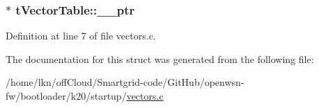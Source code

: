 \subsubsection[{\texorpdfstring{\+\_\+\+\_\+ptr}{__ptr}}]{$\ast$ t\+Vector\+Table\+::\+\_\+\+\_\+ptr}\hypertarget{structt_vector_table_a131a71eb2af6dfdd25a05f4a62f0b5fa}{}\label{structt_vector_table_a131a71eb2af6dfdd25a05f4a62f0b5fa}


Definition at line 7 of file vectors.\+c.



The documentation for this struct was generated from the following file\+:\begin{DoxyCompactItemize}
\item 
/home/lkn/off\+Cloud/\+Smartgrid-\/code/\+Git\+Hub/openwsn-\/fw/bootloader/k20/startup/\hyperlink{bootloader_2k20_2startup_2vectors_8c}{vectors.\+c}\end{DoxyCompactItemize}
